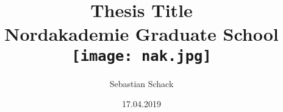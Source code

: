 \title{
{Thesis Title}\\
{\large Nordakademie Graduate School}\\
{\texttt{[image: nak.jpg]}}
}
\author{Sebastian Schack}
\date{17.04.2019}

\maketitle